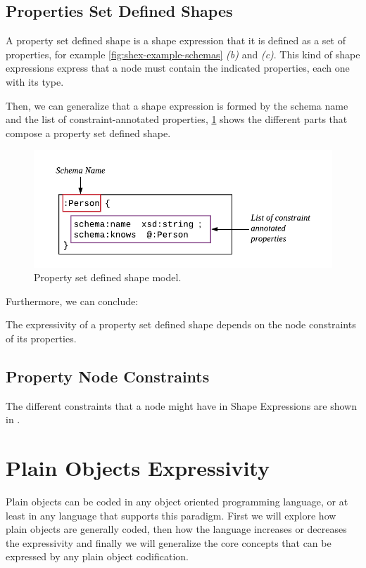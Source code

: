 \subsection{Properties Set Defined Shapes}
A property set defined shape is a shape expression that it is defined as a set of properties, for example \cref{fig:shex-example-schemas}
\textit{(b)} and \textit{(c)}. This kind of shape expressions express that a node must contain the indicated properties, each one with its type.

Then, we can generalize that a shape expression is formed by the schema name and the list of constraint-annotated properties,
\cref{fig:prop-def-shape-diagram} shows the different parts that compose a property set defined shape.

\begin{figure}
    \includegraphics[scale=0.7]{images/diagram-of-shape.pdf}
    \centering
    \caption[Property set defined shape model.]{Property set defined shape model.}
    \label{fig:prop-def-shape-diagram}
\end{figure}

Furthermore, we can conclude:

\begin{partconclusion}
    The expressivity of a property set defined shape depends on the node constraints of its properties.
\end{partconclusion}

\subsection{Property Node Constraints}
The different constraints that a node might have in Shape Expressions are shown in .



\section{Plain Objects Expressivity}
Plain objects can be coded in any object oriented programming language, or at least in
any language that supports this paradigm. First we will explore how plain objects are 
generally coded, then how the language increases or decreases the expressivity and
finally we will generalize the core concepts that can be expressed by any plain object
codification.

